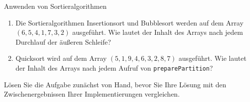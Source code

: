\documentclass[11pt,a4paper]{article}
\begin{document}
\thispagestyle{empty}


\begin{aufgabe}{1}{Anwenden von Sortieralgorithmen}
    \begin{enumerate}
        \item Die Sortieralgorithmen Insertionsort und Bubblesort werden auf dem Array $(6, 5, 4, 1, 7, 3, 2)$ ausgeführt. Wie lautet der Inhalt des Arrays nach jedem Durchlauf der äußeren Schleife? 
        \item Quicksort wird auf dem Array $(5, 1, 9, 4, 6, 3, 2, 8, 7)$ ausgeführt. Wie lautet der Inhalt des Arrays nach jedem Aufruf von \texttt{preparePartition}?
    \end{enumerate}
    Lösen Sie die Aufgabe zunächst von Hand, bevor Sie Ihre Lösung mit den Zwischenergebnissen Ihrer Implementierungen vergleichen.
\end{aufgabe}
\end{document}
